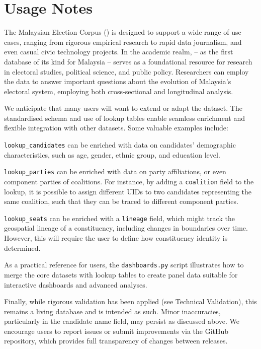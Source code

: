 \documentclass[11pt]{article}
\begin{document}
\section*{Usage Notes}

The Malaysian Election Corpus (\acronymend) is designed to support a wide range of use cases, ranging from rigorous empirical research to rapid data journalism, and even casual civic technology projects. In the academic realm, \acronym -- as the first database of its kind for Malaysia -- serves as a foundational resource for research in electoral studies, political science, and public policy. Researchers can employ the data to answer important questions about the evolution of Malaysia's electoral system, employing both cross-sectional and longitudinal analysis.

We anticipate that many users will want to extend or adapt the dataset. The standardised schema and use of lookup tables enable seamless enrichment and flexible integration with other datasets. Some valuable examples include:
\begin{enumbul}
\item \texttt{lookup\_candidates} can be enriched with data on candidates' demographic characteristics, such as age, gender, ethnic group, and education level.
\item \texttt{lookup\_parties} can be enriched with data on party affiliations, or even component parties of coalitions. For instance, by adding a \texttt{coalition} field to the lookup, it is possible to assign different UIDs to two candidates representing the same coalition, such that they can be traced to different component parties.
\item \texttt{lookup\_seats} can be enriched with a \texttt{lineage} field, which might track the geospatial lineage of a constituency, including changes in boundaries over time. However, this will require the user to define how constituency identity is determined.
\end{enumbul}
As a practical reference for users, the \texttt{dashboards.py} script illustrates how to merge the core datasets with lookup tables to create panel data suitable for interactive dashboards and advanced analyses.

Finally, while rigorous validation has been applied (see Technical Validation), this remains a living database and is intended as such. Minor inaccuracies, particularly in the candidate name field, may persist as discussed above. We encourage users to report issues or submit improvements via the GitHub repository, which provides full transparency of changes between releases. 
\end{document}
